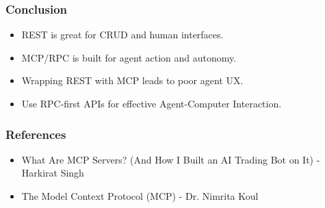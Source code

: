 \begin{frame}[fragile]\frametitle{Conclusion}
\begin{itemize}
  \item REST is great for CRUD and human interfaces.
  \item MCP/RPC is built for agent action and autonomy.
  \item Wrapping REST with MCP leads to poor agent UX.
  \item Use RPC-first APIs for effective Agent-Computer Interaction.
\end{itemize}
\end{frame}






\begin{frame}[fragile]\frametitle{References}
    \begin{itemize}
        \item What Are MCP Servers? (And How I Built an AI Trading Bot on It) - Harkirat Singh
		\item The Model Context Protocol (MCP) - Dr. Nimrita Koul


    \end{itemize}
\end{frame}



